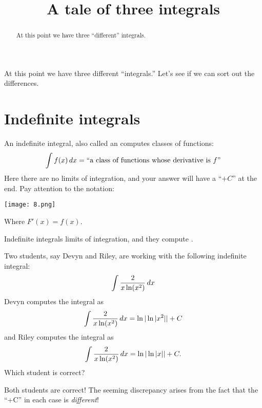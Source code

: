 \documentclass{ximera}
\title[Dig-In:]{A tale of three integrals}
\begin{document}
\begin{abstract}
  At this point we have three ``different'' integrals. 
\end{abstract}
\maketitle

At this point we have three different ``integrals.'' Let's see if we
can sort out the differences.

\section{Indefinite integrals}

An indefinite integral, also called an  computes
classes of functions:
\[
\int f(x) \mathop{}\!d x = \text{``a class of functions whose derivative is $f$''}
\]
Here there are no limits of integration, and your answer will have a
``$+C$'' at the end. Pay attention to the notation:
\begin{image}
  \texttt{[image: 8.png]}
\end{image}
Where $F'(x) = f(x)$.
\begin{explanation}%
  Indefinite integrals
   limits of
  integration, and they compute .
\end{explanation}

\begin{question}
  Two students, say Devyn and Riley, are working with the following
  indefinite integral:
  \[
  \int \frac{2}{x\ln(x^2)}\mathop{}\!d x
  \]
  Devyn computes the integral as
  \[
  \int \frac{2}{x\ln(x^2)}\mathop{}\!d x = \ln|\ln|x^2|| + C
  \]
  and Riley computes the integral as
  \[
  \int \frac{2}{x\ln(x^2)}\mathop{}\!d x = \ln|\ln|x|| + C.
  \]
  Which student is correct?
  \begin{multipleChoice}
  \end{multipleChoice}
  \begin{feedback}
    Both students are correct! The seeming discrepancy arises from the
    fact that the ``+C'' in each case is \textit{different}!
  \end{feedback}
\end{question}
\end{document}
